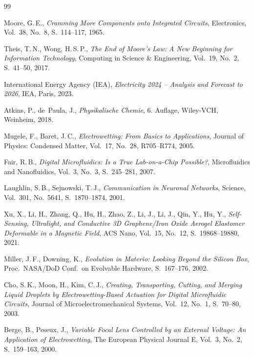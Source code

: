 ﻿\documentclass[a4paper,12pt]{scrreprt}
\theoremstyle{definition}
\begin{document}
\begin{thebibliography}{99}
	
	Moore, G.\,E.,
	\textit{Cramming More Components onto Integrated Circuits},
	Electronics, Vol.~38, No.~8, S.~114--117, 1965.
	
	Theis, T.\,N., Wong, H.\,S.\,P.,
	\textit{The End of Moore's Law: A New Beginning for Information Technology},
	Computing in Science \& Engineering, Vol.~19, No.~2, S.~41--50, 2017.
	
	International Energy Agency (IEA),
	\textit{Electricity 2024 -- Analysis and Forecast to 2026},
	IEA, Paris, 2023.
	
	Atkins, P., de~Paula, J.,
	\textit{Physikalische Chemie},
	6. Auflage, Wiley-VCH, Weinheim, 2018.
	
	Mugele, F., Baret, J.\,C.,
	\textit{Electrowetting: From Basics to Applications},
	Journal of Physics: Condensed Matter, Vol.~17, No.~28, R705--R774, 2005.
	
	Fair, R.\,B.,
	\textit{Digital Microfluidics: Is a True Lab-on-a-Chip Possible?},
	Microfluidics and Nanofluidics, Vol.~3, No.~3, S.~245--281, 2007.
	
	Laughlin, S.\,B., Sejnowski, T.\,J.,
	\textit{Communication in Neuronal Networks},
	Science, Vol.~301, No.~5641, S.~1870--1874, 2001.
	
	Xu, X., Li, H., Zhang, Q., Hu, H., Zhao, Z., Li, J., Li, J., Qin, Y., Hu, Y.,
	\textit{Self-Sensing, Ultralight, and Conductive 3D Graphene/Iron Oxide Aerogel
		Elastomer Deformable in a Magnetic Field},
	ACS Nano, Vol.~15, No.~12, S.~19868--19880, 2021.
	
	Miller, J.\,F., Downing, K.,
	\textit{Evolution in Materio: Looking Beyond the Silicon Box},
	Proc.\ NASA/DoD Conf.\ on Evolvable Hardware, S.~167--176, 2002.
	
	Cho, S.\,K., Moon, H., Kim, C.\,J.,
	\textit{Creating, Transporting, Cutting, and Merging Liquid Droplets by
		Electrowetting-Based Actuation for Digital Microfluidic Circuits},
	Journal of Microelectromechanical Systems, Vol.~12, No.~1, S.~70--80, 2003.
	
	Berge, B., Peseux, J.,
	\textit{Variable Focal Lens Controlled by an External Voltage:
		An Application of Electrowetting},
	The European Physical Journal E, Vol.~3, No.~2, S.~159--163, 2000.
	

\end{thebibliography}
\end{document}
